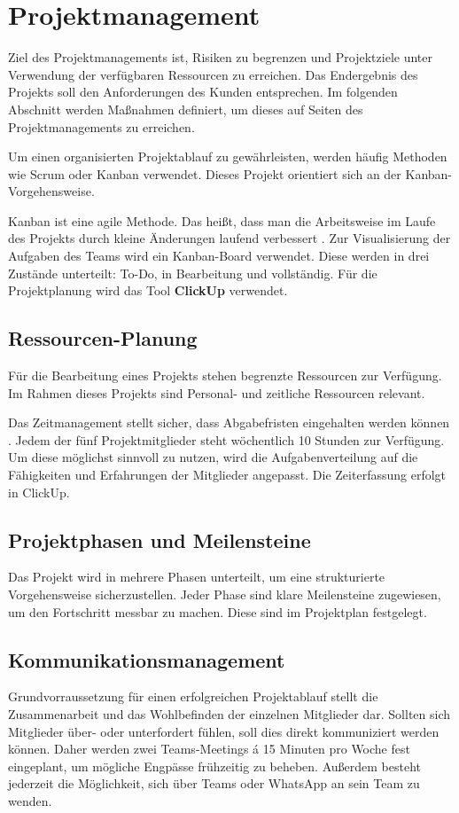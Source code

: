 \documentclass[a4paper,12pt]{article}
\begin{document}
\section{Projektmanagement}
Ziel des Projektmanagements ist, Risiken zu begrenzen und Projektziele unter Verwendung der verfügbaren Ressourcen zu erreichen. Das Endergebnis des Projekts soll den Anforderungen des Kunden entsprechen. Im folgenden Abschnitt werden Maßnahmen definiert, um dieses auf Seiten des Projektmanagements zu erreichen.

Um einen organisierten Projektablauf zu gewährleisten, werden häufig Methoden wie Scrum oder Kanban verwendet. Dieses Projekt orientiert sich an der Kanban-Vorgehensweise.

Kanban ist eine agile Methode. Das heißt, dass man die Arbeitsweise im Laufe des Projekts durch kleine Änderungen laufend verbessert \cite{dechange_agiles_2024}. Zur Visualisierung der Aufgaben des Teams wird ein Kanban-Board verwendet. Diese werden in drei Zustände unterteilt: To-Do, in Bearbeitung und vollständig. Für die Projektplanung wird das Tool \textbf{ClickUp} verwendet.

\subsection{Ressourcen-Planung} Für die Bearbeitung eines Projekts stehen begrenzte Ressourcen zur Verfügung. Im Rahmen dieses Projekts sind Personal- und zeitliche Ressourcen relevant.

Das Zeitmanagement stellt sicher, dass Abgabefristen eingehalten werden können \cite{helmold_projektmanagement_2023}. Jedem der fünf Projektmitglieder steht wöchentlich 10 Stunden zur Verfügung. Um diese möglichst sinnvoll zu nutzen, wird die Aufgabenverteilung auf die Fähigkeiten und Erfahrungen der Mitglieder angepasst. Die Zeiterfassung erfolgt in ClickUp.

\subsection{Projektphasen und Meilensteine} Das Projekt wird in mehrere Phasen unterteilt, um eine strukturierte Vorgehensweise sicherzustellen. Jeder Phase sind klare Meilensteine zugewiesen, um den Fortschritt messbar zu machen. Diese sind im Projektplan festgelegt.

\subsection{Kommunikationsmanagement} Grundvorraussetzung für einen erfolgreichen Projektablauf stellt die Zusammenarbeit und das Wohlbefinden der einzelnen Mitglieder dar. Sollten sich Mitglieder über- oder unterfordert fühlen, soll dies direkt kommuniziert werden können. Daher werden zwei Teams-Meetings á 15 Minuten pro Woche fest eingeplant, um mögliche Engpässe frühzeitig zu beheben. Außerdem besteht jederzeit die Möglichkeit, sich über Teams oder WhatsApp an sein Team zu wenden.
\end{document}
